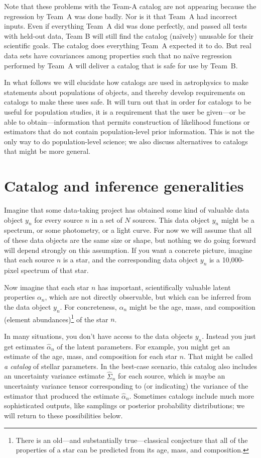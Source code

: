 \documentclass[10pt]{article}
\begin{document}
Note that these problems with the Team-A catalog are not appearing because the regression by Team~A was done badly.
Nor is it that Team~A had incorrect inputs.
Even if everything Team~A did was done perfectly, and passed all tests with held-out data, Team B will still find the catalog (na\"ively) unusable for their scientific goals.
The catalog does everything Team~A expected it to do.
But real data sets have covariances among properties such that no na\"ive regression performed by Team~A will deliver a catalog that is safe for use by Team~B.

In what follows we will elucidate how catalogs are used in astrophysics to make statements about populations of objects, and thereby develop requirements on catalogs to make these uses safe.
It will turn out that in order for catalogs to be useful for population studies, it is a requirement that the user be given---or be able to obtain---information that permits construction of likelihood functions or estimators that do not contain population-level prior information.
This is not the only way to do population-level science; we also discuss alternatives to catalogs that might be more general.

\section{Catalog and inference generalities}

Imagine that some data-taking project has obtained some kind of valuable data object $y_n$ for every source $n$ in a set of $N$ sources.
This data object $y_n$ might be a spectrum, or some photometry, or a light curve.
For now we will assume that all of these data objects are the same size or shape, but nothing we do going forward will depend strongly on this assumption.
If you want a concrete picture, imagine that each source $n$ is a star, and the corresponding data object $y_n$ is a 10,000-pixel spectrum of that star.

Now imagine that each star $n$ has important, scientifically valuable latent properties $\alpha_n$, which are not directly observable, but which can be inferred from the data object $y_n$.
For concreteness, $\alpha_n$ might be the age, mass, and composition (element abundances)\footnote{There is an old---and substantially true---classical conjecture that all of the properties of a star can be predicted from its age, mass, and composition.} of the star $n$.

In many situations, you don't have access to the data objects $y_n$.
Instead you just get estimates $\hat{\alpha}_n$ of the latent parameters.
For example, you might get an estimate of the age, mass, and composition for each star $n$.
That might be called \emph{a catalog} of stellar parameters.
In the best-case scenario, this catalog also includes an uncertainty variance estimate $\hat{\Sigma}_n$ for each source, which is maybe an uncertainty variance tensor corresponding to (or indicating) the variance of the estimator that produced the estimate $\hat{\alpha}_n$.
Sometimes catalogs include much more sophisticated outputs, like samplings or posterior probability distributions; we will return to these possibilities below.
\end{document}

